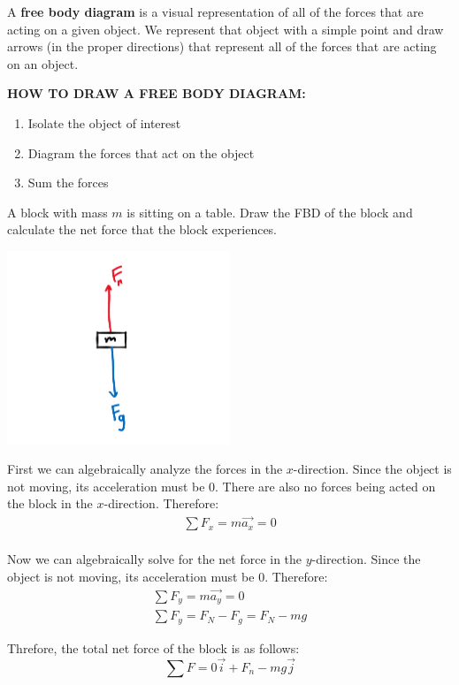 A \textbf{free body diagram} is a visual representation of all of the forces that are acting on a given object. We represent that object with a simple point and draw arrows (in the proper directions) that represent all of the forces that are acting on an object.\\

\begin{center}\textbf{HOW TO DRAW A FREE BODY DIAGRAM:}\end{center}
\begin{enumerate}
	\item Isolate the object of interest
	\item Diagram the forces that act on the object
	\item Sum the forces
\end{enumerate}
\newpage

\begin{problem}
	A block with mass $m$ is sitting on a table. Draw the FBD of the block and calculate the net force that the block experiences.

	\begin{center}
		\includegraphics[width=0.5\textwidth]{chapters/ch3/images/fig3_1.PNG}
	\end{center}
	First we can algebraically analyze the forces in the $x$-direction. Since the object is not moving, its acceleration must be 0. There are also no forces being acted on the block in the $x$-direction. Therefore:
	$$
		\begin{aligned}
			\sum F_x = m\vec{a_x} = 0\\
		\end{aligned}
	$$

	Now we can algebraically solve for the net force in the $y$-direction. Since the object is not moving, its acceleration must be 0. Therefore:
	$$
		\begin{aligned}
			\sum F_y = m\vec{a_y} = 0\\
			\sum F_y = F_N - F_g = F_N - mg
		\end{aligned}
	$$

	Threfore, the total net force of the block is as follows:
	$$
		\sum F = 0\vec{i} + F_n-mg \vec{j}
	$$
\end{problem}


